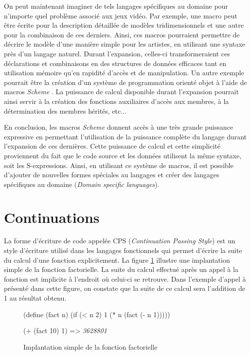 \documentclass[12pt,twoside,letterpaper,francais]{book}
\newcommand{\Schemelang}{{\textit{Scheme }}}
\newcommand{\scheme}[1]{\selectlanguage{english}{\tt #1}\selectlanguage{french}}
\newcommand{\schemeresult}[1]{{\it #1}}
\begin{document}
On peut maintenant imaginer de tels langages spécifiques au domaine
pour n'importe quel problème associé aux jeux vidéo. Par exemple, une
macro peut être écrite pour la description détaillée de modèles
tridimensionnels et une autre pour la combinaison de ces
derniers. Ainsi, ces macros pourraient permettre de décrire le modèle
d'une manière simple pour les artistes, en utilisant une syntaxe près
d'un langage naturel. Durant l'expansion, celles-ci transformeraient
ces déclarations et combinaisons en des structures de données
efficaces tant en utilisation mémoire qu'en rapidité d'accès et de
manipulation. Un autre exemple pourrait être la création d'un système
de programmation orienté objet à l'aide de macros \Schemelang. La
puissance de calcul disponible durant l'expansion pourrait ainsi
servir à la création des fonctions auxiliaires d'accès aux membres, à
la détermination des membres hérités, etc...

En conclusion, les macros \Schemelang donnent accès à une très grande
puissance expressive en permettant l'utilisation de la puissance
complète du langage durant l'expansion de ces dernières. Cette
puissance de calcul et cette simplicité proviennent du fait que le
code source et les données utilisent la même syntaxe, soit les
S-expressions. Ainsi, en utilisant ce système de macros, il est
possible d'ajouter de nouvelles formes spéciales au langages et créer
des langages spécifiques au domaine (\textit{Domain specific
  languages}).


\FloatBarrier
\section{Continuations}
La forme d'écriture de code appelée CPS (\textit{Continuation Passing
  Style}) est un style d'écriture utilisé dans les langages
fonctionnels qui permet d'écrire la suite du calcul d'une fonction
explicitement. La figure \ref{Scheme:fact} illustre une implantation
simple de la fonction factorielle. La suite du calcul effectué après
un appel à la fonction \scheme{fact} est implicite à l'endroit où
celui-ci se retrouve. Dans l'exemple d'appel à \scheme{fact} présenté
dans cette figure, on constate que la suite de ce calcul sera
l'addition de 1 au résultat obtenu.

\begin{figure}[htb!]
  \begin{schemecode}
(define (fact n)
  (if (< n 2)
      1
      (* n (fact (- n 1)))))

(+ (fact 10) 1) => \schemeresult{3628801}
  \end{schemecode}
  \caption{Implantation simple de la fonction factorielle}
  \label{Scheme:fact}
\end{figure}
\end{document}
